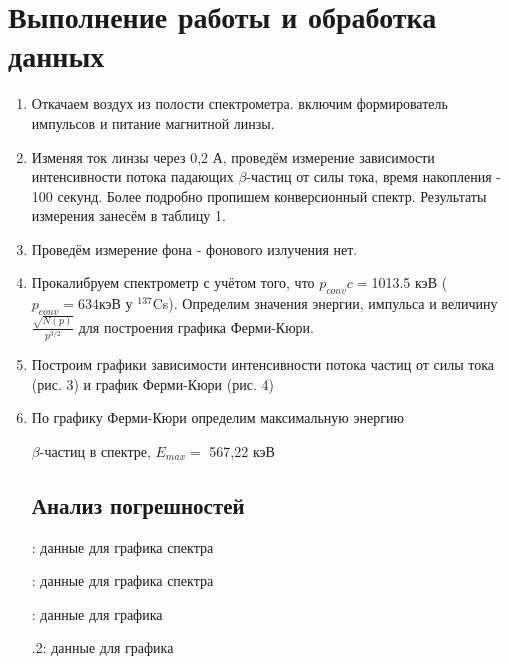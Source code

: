 \documentclass[15pt,a5paper,reqno]{article}
\begin{document}
\section{Выполнение работы и обработка данных}

\begin{enumerate}
    \item Откачаем воздух из полости спектрометра. включим формирователь импульсов и питание магнитной линзы.
    \item Изменяя ток линзы через 0,2 А, проведём измерение зависимости интенсивности потока падающих $\beta$-частиц от силы тока, время накопления - 100 секунд. Более подробно пропишем конверсионный спектр. Результаты измерения занесём в таблицу 1.
    \item Проведём измерение фона - фонового излучения нет.
    \item Прокалибруем спектрометр с учётом того, что $p_{conv}c = $1013.5 кэВ ($p_{conv} = 634 $кэВ у $^{137}$Cs). Определим значения энергии, импульса и величину $\frac{\sqrt{N(p)}}{p^{3/2}}$ для построения графика Ферми-Кюри.
    \item Построим графики зависимости интенсивности потока частиц от силы тока (рис. 3) и график Ферми-Кюри (рис. 4)
    
    \item По графику Ферми-Кюри определим максимальную энергию 

		  $\beta$-частиц в спектре, $E_{max} = $ 567,22 кэВ

  
\subsection{Анализ погрешностей}

\begin{table}[h!]
	\centering
	
	\caption{: данные для графика спектра}
	\label{tb1}
\end{table}


\begin{table}[h!]
	\centering
	
	\caption{: данные для графика спектра}
	\label{tb2}
\end{table}

\begin{table}[h!]
	\centering
	
	\caption{: данные для графика}
	\label{tb3}
\end{table}


\begin{table}[h!]
	\centering
	
	\caption{.2: данные для графика}
	\label{tb4}
\end{table}



\end{enumerate}
\end{document}
